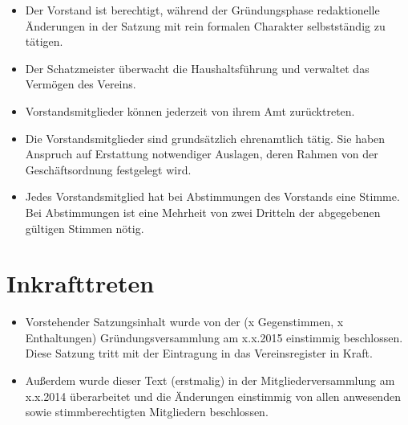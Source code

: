 \documentclass[a4paper,10pt]{article}
\begin{document}
\begin{itemize}
   \item Der Vorstand ist berechtigt, während der Gründungsphase redaktionelle Änderungen in der Satzung mit rein formalen Charakter selbstständig zu tätigen. 
   \item Der Schatzmeister überwacht die Haushaltsführung und verwaltet das Vermögen des Vereins.
   \item Vorstandsmitglieder können jederzeit von ihrem Amt zurücktreten.
   \item Die Vorstandsmitglieder sind grundsätzlich ehrenamtlich tätig. Sie haben Anspruch auf Erstattung notwendiger Auslagen, deren Rahmen von der Geschäftsordnung festgelegt wird.
   \item Jedes Vorstandsmitglied hat bei Abstimmungen des Vorstands eine Stimme. Bei Abstimmungen ist eine Mehrheit von zwei Dritteln der abgegebenen gültigen Stimmen nötig.
  \end{itemize}

\section{Inkrafttreten}
  \begin{itemize}
   \item Vorstehender Satzungsinhalt wurde von der (x Gegenstimmen, x Enthaltungen) Gründungsversammlung am x.x.2015 einstimmig beschlossen. Diese Satzung tritt mit der Eintragung in das Vereinsregister in Kraft. 
   \item Außerdem wurde dieser Text (erstmalig) in der Mitgliederversammlung am x.x.2014 überarbeitet und die Änderungen einstimmig von allen anwesenden sowie stimmberechtigten Mitgliedern beschlossen. 
  \end{itemize}

  
\end{document}
